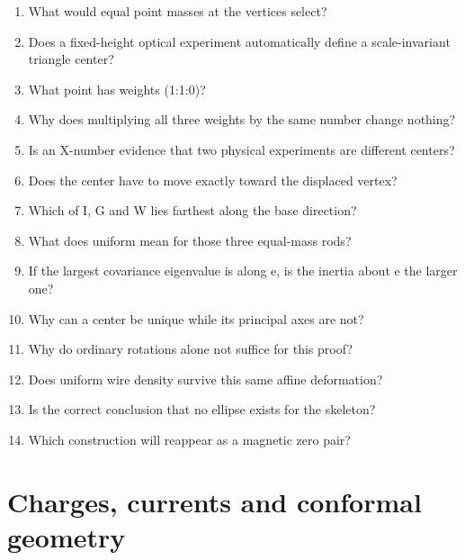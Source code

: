 \documentclass[11pt,oneside,openany]{book}
\begin{document}
\begin{enumerate}

\item\label{ex:2} What would equal point masses at the vertices select?

\item\label{ex:3} Does a fixed-height optical experiment automatically define a scale-invariant triangle center?

\item\label{ex:4} What point has weights (1:1:0)?

\item\label{ex:5} Why does multiplying all three weights by the same number change nothing?

\item\label{ex:6} Is an X-number evidence that two physical experiments are different centers?

\item\label{ex:7} Does the center have to move exactly toward the displaced vertex?

\item\label{ex:8} Which of I, G and W lies farthest along the base direction?

\item\label{ex:9} What does uniform mean for those three equal-mass rods?

\item\label{ex:10} If the largest covariance eigenvalue is along e, is the inertia about e the larger one?

\item\label{ex:11} Why can a center be unique while its principal axes are not?

\item\label{ex:12} Why do ordinary rotations alone not suffice for this proof?

\item\label{ex:13} Does uniform wire density survive this same affine deformation?

\item\label{ex:14} Is the correct conclusion that no ellipse exists for the skeleton?

\item\label{ex:15} Which construction will reappear as a magnetic zero pair?

\end{enumerate}

\chapter{Charges, currents and conformal geometry}\label{ch:2}
\end{document}
